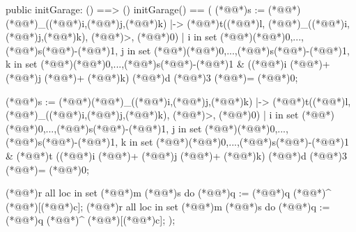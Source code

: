 \documentclass[a4paper]{article}
\begin{document}
\begin{vdm_al}
public initGarage: () ==> ()
initGarage() ==
(
    (*@@*)s := (*@\vdmnotcovered{}@*){(*@@*)_((*@\vdmnotcovered{}@*)i,(*@\vdmnotcovered{}@*)j,(*@\vdmnotcovered{}@*)k) |-> (*@@*)t((*@@*)l, (*@@*)_((*@\vdmnotcovered{}@*)i,(*@\vdmnotcovered{}@*)j,(*@\vdmnotcovered{}@*)k), (*@@*)>, (*@\vdmnotcovered{}@*)0) | 
    i in set (*@\vdmnotcovered{}@*){(*@\vdmnotcovered{}@*)0,...,(*@@*)s(*@\vdmnotcovered{}@*)-(*@\vdmnotcovered{}@*)1}, 
    j in set (*@\vdmnotcovered{}@*){(*@\vdmnotcovered{}@*)0,...,(*@@*)s(*@\vdmnotcovered{}@*)-(*@\vdmnotcovered{}@*)1}, 
    k in set (*@\vdmnotcovered{}@*){(*@\vdmnotcovered{}@*)0,...,(*@@*)s(*@\vdmnotcovered{}@*)-(*@\vdmnotcovered{}@*)1} 
    & ((*@\vdmnotcovered{}@*)i (*@\vdmnotcovered{}@*)+ (*@\vdmnotcovered{}@*)j (*@\vdmnotcovered{}@*)+ (*@\vdmnotcovered{}@*)k) (*@@*)d (*@\vdmnotcovered{}@*)3 (*@\vdmnotcovered{}@*)= (*@\vdmnotcovered{}@*)0};

    (*@@*)s := (*@\vdmnotcovered{}@*){(*@@*)_((*@\vdmnotcovered{}@*)i,(*@\vdmnotcovered{}@*)j,(*@\vdmnotcovered{}@*)k) |-> (*@@*)t((*@@*)l, (*@@*)_((*@\vdmnotcovered{}@*)i,(*@\vdmnotcovered{}@*)j,(*@\vdmnotcovered{}@*)k), (*@@*)>, (*@\vdmnotcovered{}@*)0) | i in 
    set (*@\vdmnotcovered{}@*){(*@\vdmnotcovered{}@*)0,...,(*@@*)s(*@\vdmnotcovered{}@*)-(*@\vdmnotcovered{}@*)1}, 
    j in set (*@\vdmnotcovered{}@*){(*@\vdmnotcovered{}@*)0,...,(*@@*)s(*@\vdmnotcovered{}@*)-(*@\vdmnotcovered{}@*)1}, 
    k in set (*@\vdmnotcovered{}@*){(*@\vdmnotcovered{}@*)0,...,(*@@*)s(*@\vdmnotcovered{}@*)-(*@\vdmnotcovered{}@*)1} 
    & (*@@*)t ((*@\vdmnotcovered{}@*)i (*@\vdmnotcovered{}@*)+ (*@\vdmnotcovered{}@*)j (*@\vdmnotcovered{}@*)+ (*@\vdmnotcovered{}@*)k) (*@@*)d (*@\vdmnotcovered{}@*)3 (*@\vdmnotcovered{}@*)= (*@\vdmnotcovered{}@*)0};

    (*@@*)r all loc in set (*@@*)m (*@@*)s do
        (*@@*)q := (*@@*)q (*@\vdmnotcovered{}@*)^ (*@\vdmnotcovered{}@*)[(*@@*)c];
    (*@@*)r all loc in set (*@@*)m (*@@*)s do
        (*@@*)q := (*@@*)q (*@\vdmnotcovered{}@*)^ (*@\vdmnotcovered{}@*)[(*@@*)c];
);


\end{vdm_al}
\end{document}
